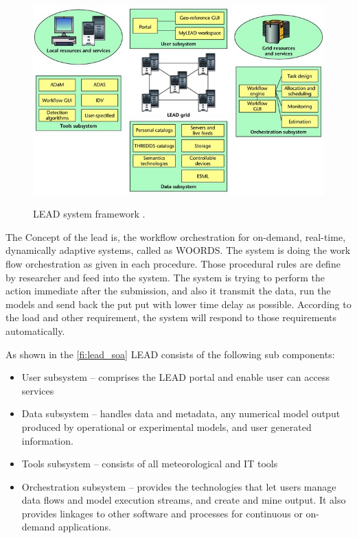 \begin{figure}[htp]
    \centering
    \includegraphics[width=1.0\textwidth]{lead/LEAD-system-framework-LEAD-is-composed-of-several-interacting-subsystems-with-the-LEAD_W640.jpg}\\
    \caption{LEAD system framework %
    \cite{Droegemeier2005Service-OrientedWeather} .}
    \label{fi:lead_framework}
\end{figure}

The Concept of the \acrshort{lead} is, the workflow orchestration for on-demand, real-time, dynamically adaptive systems, called as WOORDS. The system is doing the work flow orchestration as given in each procedure. Those procedural rules are define by researcher and feed into the system. The system is trying to perform the action immediate after the submission, and also it transmit the data, run the models and send back the put put with lower time delay as possible. According to the load and other requirement, the system will respond to those requirements automatically.

As shown in the \ref{fi:lead_soa} LEAD consists of the following sub components:
\begin{itemize}
\item User subsystem -- comprises the LEAD portal and enable user can access services
\item Data subsystem -- handles data and metadata, any numerical model output produced by operational or experimental models, and user generated information.
\item Tools subsystem -- consists of all meteorological and IT tools
\item Orchestration subsystem -- provides the technologies that let users manage data flows and model execution streams, and create and mine output. It also provides linkages to other software and processes for continuous or on-demand applications. 
\end{itemize}

